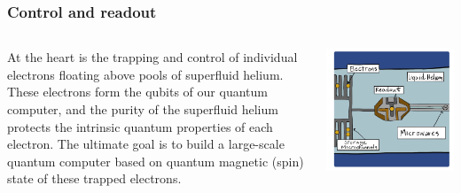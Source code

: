 \documentclass{beamer}
\begin{document}
\frame
    {
      \frametitle{Control and readout}
	
      \begin{footnotesize}
     \begin{columns}
       \column{5.0cm}

       At the heart is the trapping and control
       of individual electrons floating above pools of superfluid
       helium. These electrons form the qubits of our quantum
       computer, and the purity of the superfluid helium protects the
       intrinsic quantum properties of each electron. The  ultimate
       goal is to build a large-scale quantum computer based on
       quantum magnetic (spin) state of these trapped electrons.


\column{5cm}
      \begin{center}
	\includegraphics[width=1.2\textwidth]{qcfigures/nordicquantumfig3.png}
      \end{center}
\end{columns}
      \end{footnotesize}
    }
\end{document}
